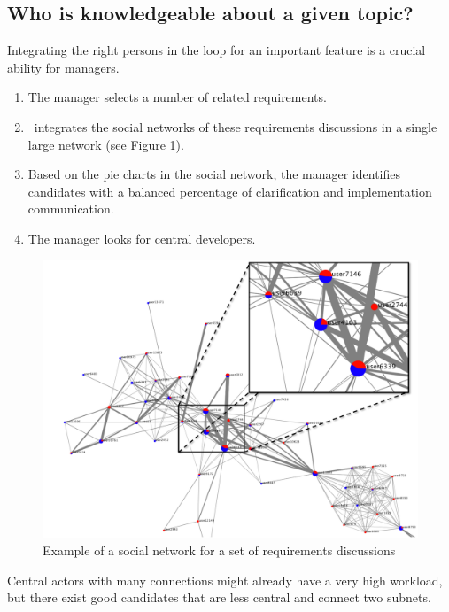 \subsection{Who is knowledgeable about a given topic?}

Integrating the right persons in the loop for an important feature is a crucial ability for managers.
\begin{enumerate}
\item The manager selects a number of related requirements. 
\item \viss\ integrates the social networks of these requirements discussions in a single large network (see Figure \ref{fig:example-sn-large}).
\item Based on the pie charts in the social network, the manager identifies candidates with a balanced percentage of clarification and implementation communication.
\item The manager looks for central developers. 
\end{enumerate}
\begin{figure}
\includegraphics[width=\columnwidth]{img/example-sn-large}
\caption{Example of a social network for a set of requirements discussions}
\label{fig:example-sn-large}
\end{figure}
Central actors with many connections might already have a very high workload, but there exist good candidates that are less central and connect two subnets.
